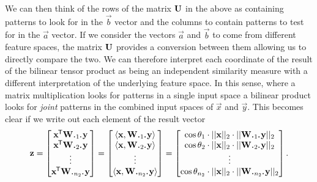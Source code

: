 We can then think of the rows of the matrix \(\mathbf{U}\) in the
above as containing patterns to look for in the \(\vec{b}\) vector and the columns to
contain patterns to test for in the \(\vec{a}\) vector. If we consider the vectors 
\(\vec{a}\) and \(\vec{b}\) to come from different feature spaces, the matrix \(\mathbf{U}\)
provides a conversion between them allowing us to directly compare the two. We can therefore
interpret each coordinate of the result of the bilinear tensor product as being an
independent similarity measure with a different interpretation of the underlying
feature space. In this sense, where a matrix multiplication looks for patterns in a single input
space a bilinear product looks for \emph{joint} patterns in the combined input spaces of
\(\vec{x}\) and \(\vec{y}\). This becomes clear if we write out each element of the result
vector
\begin{equation} \label{eq:features}
	\vec{z} = \begin{bmatrix}
		\tran{\vec{x}}\mat{W}_{\midbullet 1 \midbullet}\vec{y} \\
		\tran{\vec{x}}\mat{W}_{\midbullet 2 \midbullet}\vec{y} \\
		\vdots \\
		\tran{\vec{x}}\mat{W}_{\midbullet n_2 \midbullet}\vec{y}
	\end{bmatrix}
	= \begin{bmatrix}
		\langle\vec{x}, \mat{W}_{\midbullet 1 \midbullet} \vec{y}\rangle \\
		\langle\vec{x}, \mat{W}_{\midbullet 2 \midbullet} \vec{y}\rangle \\
		\vdots \\
		\langle\vec{x}, \mat{W}_{\midbullet n_2 \midbullet} \vec{y}\rangle
	\end{bmatrix}
	 = \begin{bmatrix}
	 	\cos \theta_1 \cdot ||\vec{x}||_2 \cdot ||\mat{W}_{\midbullet 1 \midbullet}\vec{y}||_2 \\
	 	\cos \theta_2 \cdot ||\vec{x}||_2 \cdot ||\mat{W}_{\midbullet 2 \midbullet}\vec{y}||_2 \\
		\vdots \\
	 	\cos \theta_{n_2} \cdot ||\vec{x}||_2 \cdot ||\mat{W}_{\midbullet n_2 \midbullet}\vec{y}||_2 \\
	 \end{bmatrix}.
\end{equation}


